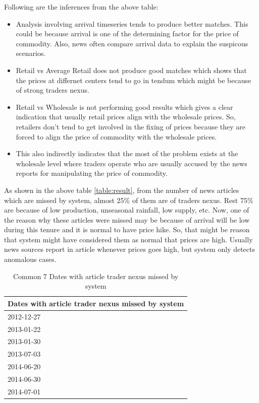 \documentclass[a4paper,10pt]{article}
\begin{document}
Following are the inferences from the above table:
\begin{itemize}
 \item Analysis involving arrival timeseries tends to produce better matches. This could be because arrival is one of the determining factor for the price of commodity. Also, news often compare arrival data to explain the suspicous scenarios.
 \item Retail vs Average Retail does not produce good matches which shows that the prices at differnet centers tend to go in tendum which might be because of strong traders nexus.
 \item Retail vs Wholesale is not performing good results which gives a clear indication that usually retail prices align with the wholesale prices. So, retailers don't tend to get involved in the fixing of prices because they are forced to align the price of commodity with the wholesale prices.
 \item This also indirectly indicates that the most of the problem exists at the wholesale level where traders operate who are usually accused by the news reports for manipulating the price of commodity.
\end{itemize}

As shown in the above table \ref{table:result}, from the number of news articles which are missed by system, almost 25\% of them are of traders nexus. Rest 75\% are because of low production, unseasonal rainfall, low supply, etc. Now, one of the reason why these articles were missed may be because of arrival will be low during this tenure and it is normal to have price hike. So, that might be reason that system might have considered them as normal that prices are high. Usually news sources report in article whenever prices goes high, but system only detects anomalous cases.

\begin{table}[H]
	\centering	
	\begin{tabular}{|l|}
		\hline
		\textbf{Dates with article trader nexus missed by system} \\ \hline
		2012-12-27                                                \\ \hline
		2013-01-22                                                \\ \hline
		2013-01-30                                                \\ \hline
		2013-07-03                                                \\ \hline
		2014-06-20                                                \\ \hline
		2014-06-30                                                \\ \hline
		2014-07-01                                                \\ \hline
	\end{tabular}
	\caption{Common 7 Dates with article trader nexus missed by system}
	\label{table:missed7}
\end{table}
\end{document}
